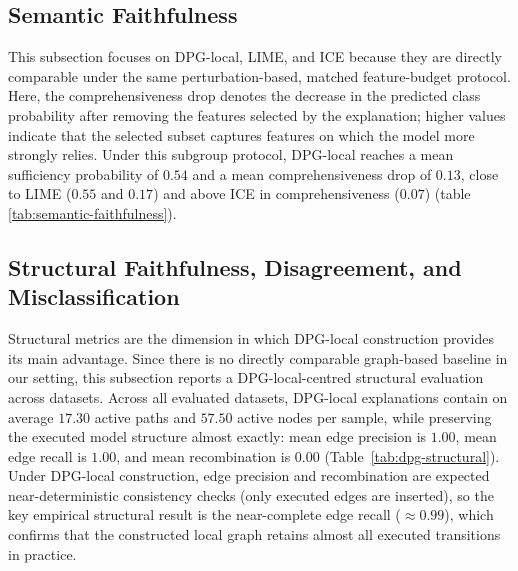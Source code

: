 \documentclass[runningheads]{llncs}
\begin{document}
\subsection{Semantic Faithfulness}

This subsection focuses on DPG-local, LIME, and ICE because they are directly
comparable under the same perturbation-based, matched feature-budget protocol. Here, the comprehensiveness drop denotes the decrease in the predicted class
probability after removing the features selected by the explanation; higher
values indicate that the selected subset captures features on which the model
more strongly relies. Under this subgroup protocol, DPG-local reaches a mean
sufficiency probability of $0.54$ and a mean comprehensiveness drop of $0.13$,
close to LIME ($0.55$ and $0.17$) and above ICE in comprehensiveness
($0.07$) (table \ref{tab:semantic-faithfulness}).


\subsection{Structural Faithfulness, Disagreement, and Misclassification}

Structural metrics are the dimension in which DPG-local construction provides its main advantage. Since there is no directly comparable graph-based baseline in our setting, this subsection reports a DPG-local-centred structural evaluation across datasets. Across all evaluated datasets, DPG-local explanations contain on average $17.30$ active paths and $57.50$ active nodes per sample, while preserving the executed model structure almost exactly: mean edge precision is $1.00$, mean edge recall is $1.00$, and mean recombination is $0.00$ (Table~\ref{tab:dpg-structural}). Under DPG-local construction, edge precision and recombination are expected near-deterministic consistency checks (only executed edges are inserted), so the key empirical structural result is the near-complete edge recall ($\approx0.99$), which confirms that the constructed local graph retains almost all executed transitions in practice.
\end{document}
